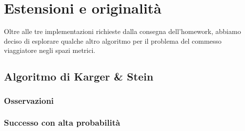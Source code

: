 \section{Estensioni e originalità}
\label{cap:extensions-and-originalities}

\noindent Oltre alle tre implementazioni richieste dalla consegna
dell'homework, abbiamo deciso di esplorare qualche altro algoritmo per il problema del commesso viaggiatore negli spazi metrici.

\subsection{Algoritmo di Karger \& Stein}
\label{sub:karger-stein-algorithm}

\subsubsection{Osservazioni}

\subsubsection{Successo con alta probabilità}
\label{sub:karger-stein-success-whp}
